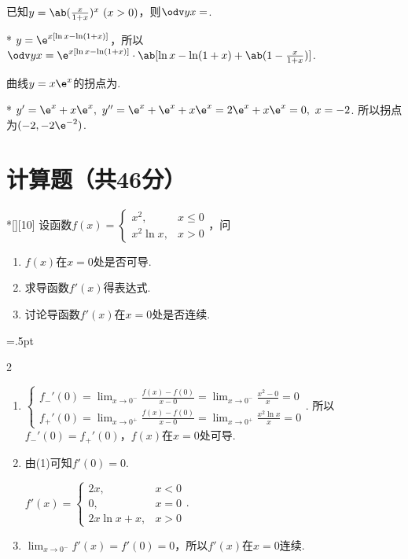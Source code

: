 \begin{problem}
    已知$y=\ab(\frac{x}{1+x})^x\ (x>0)$，则$\odv yx=$.
\end{problem}
\begin{solution}*
    $y=\e^{x[\ln x-\ln(1+x)]}$，所以$\odv yx=\e^{x[\ln x-\ln(1+x)]}\cdot\ab[\ln x-\ln(1+x)+\ab(1-\frac{x}{1+x})]$.
\end{solution}

\begin{problem}
    曲线$y=x\e^x$的拐点为.
\end{problem}
\begin{solution}*
    $y'=\e^x+x\e^x,\ y''=\e^x+\e^x+x\e^x=2\e^x+x\e^x=0,\ x=-2$. 所以拐点为$(-2,-2\e^{-2})$.
\end{solution}

\section{计算题（共46分）}
\begin{problem}*[][10]
    设函数$f(x)=\begin{cases}
        x^2, & x\leq 0\\
        x^2\ln x, & x>0
    \end{cases}$，问
\begin{enumerate}
    \item $f(x)$在$x=0$处是否可导.
    \item 求导函数$f'(x)$得表达式.
    \item 讨论导函数$f'(x)$在$x=0$处是否连续.
\end{enumerate}
\end{problem}
\begin{solution}
\columnseprule=.5pt
\begin{multicols*}{2}
\begin{enumerate}
    \item $\begin{cases}
        f_-'(0)=\lim_{x\to 0^-}\frac{f(x)-f(0)}{x-0}=\lim_{x\to 0^-}\frac{x^2-0}{x}=0\\
        f_+'(0)=\lim_{x\to 0^+}\frac{f(x)-f(0)}{x-0}=\lim_{x\to 0^+}\frac{x^2\ln x}{x}=0
    \end{cases}$. 所以$f_-'(0)=f_+'(0)$，$f(x)$在$x=0$处可导.
    \item 由(1)可知$f'(0)=0$.
    
    $f'(x)=\begin{cases}
        2x, & x<0\\
        0, & x=0\\
        2x\ln x+x, &x>0
    \end{cases}$.
    \item $\lim_{x\to 0^-}f'(x)=f'(0)=0$，所以$f'(x)$在$x=0$连续.
\end{enumerate}
\end{multicols*}
\end{solution}

